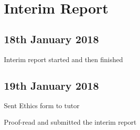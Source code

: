 \section{Interim Report}

\subsection{18th January 2018}
Interim report started and then finished

\subsection{19th January 2018}
Sent Ethics form to tutor

Proof-read and submitted the interim report
